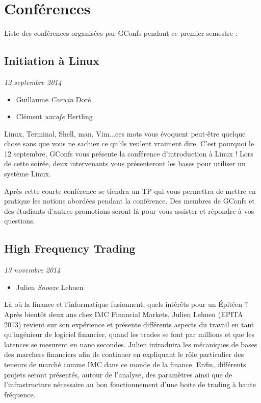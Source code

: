\documentclass[a4paper]{article}
\title{\mytitle}
\author{toogy \and Corwin}
\begin{document}
\maketitle

\tableofcontents

\newpage

\section{Conférences}

Liste des conférences organisées par GConfs pendant ce premier semestre :\\

\subsection{Initiation à Linux}
\emph{12 septembre 2014}
\begin{itemize}
    \item Guillaume \emph{Corwin} Doré
    \item Clément \emph{wxcafe} Hertling
\end{itemize}

Linux, Terminal, Shell, man, Vim...ces mots vous évoquent peut-être quelque
chose sans que vous ne sachiez ce qu'ils veulent vraiment dire.
C'est pourquoi le 12 septembre, GConfs vous présente la conférence
d'introduction à Linux !
Lors de cette soirée, deux intervenants vous présenteront les bases pour
utiliser un système Linux.

Après cette courte conférence se tiendra un TP qui vous permettra de mettre en
pratique les notions abordées pendant la conférence.  Des membres de GConfs et
des étudiants d'autres promotions seront là pour vous assister et répondre à
vos questions.

\vspace{0.3cm}

\subsection{High Frequency Trading}
\emph{13 novembre 2014}
\begin{itemize}
    \item Julien \emph{Snooze} Lehuen
\end{itemize}

Là où la finance et l'informatique fusionnent, quels intérêts pour un Épitéen ?
Après bientôt deux ans chez IMC Financial Markets, Julien Lehuen (EPITA 2013)
revient sur son expérience et présente différents aspects du travail en tant
qu'ingénieur de logiciel financier, quand les trades se font par millions et
que les latences se mesurent en nano secondes. Julien introduira les mécaniques
de bases des marchers financiers afin de continuer en expliquant le rôle
particulier des teneurs de marché comme IMC dans ce monde de la finance. Enfin,
différents projets seront présentés, autour de l'analyse, des paramètres ainsi
que de l'infrastructure nécessaire au bon fonctionnement d'une boite de trading
à haute fréquence.
\end{document}
